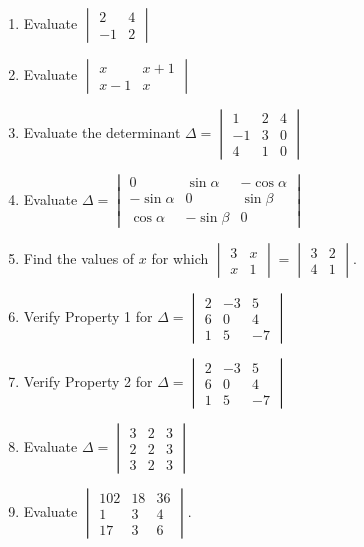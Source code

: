\begin{enumerate}
\item Evaluate $\begin{vmatrix}2&4\\ -1&2\end{vmatrix}$
\item Evaluate $\begin{vmatrix}x&x+1\\ x-1&x\end{vmatrix}$
\item Evaluate the determinant $\Delta =\begin{vmatrix}1&2&4\\-1&3&0\\4&1&0\end{vmatrix}$
\item Evaluate $\Delta= \begin{vmatrix}0&\sin\alpha&-\cos\alpha\\ -\sin\alpha&0&\sin\beta\\ \cos\alpha& -\sin\beta&0\end{vmatrix}$
\item Find the values of $x$ for which $\begin{vmatrix}3&x\\x&1\end{vmatrix}= \begin{vmatrix}3&2\\4&1\end{vmatrix}$.
\item Verify Property 1 for $\Delta=\begin{vmatrix}2 &- 3 & 5\\6 & 0 & 4\\1 & 5 & -7\end{vmatrix}$
\item Verify Property 2 for $\Delta=\begin{vmatrix}2&-3&5\\6&0&4\\1&5&-7 \end{vmatrix}$
\item Evaluate $\Delta=\begin{vmatrix}3&2&3\\2&2&3\\3&2&3\end{vmatrix}$
\item Evaluate $\begin{vmatrix}102&18&36 \\ 1&3&4 \\ 17&3&6 \end{vmatrix}$.

\end{enumerate}
